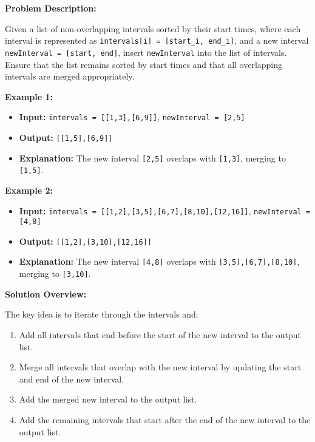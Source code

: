 

\textbf{Problem Description:}

Given a list of non-overlapping intervals sorted by their start times, where each interval is represented as \texttt{intervals[i] = [start\_i, end\_i]}, and a new interval \texttt{newInterval = [start, end]}, insert \texttt{newInterval} into the list of intervals. Ensure that the list remains sorted by start times and that all overlapping intervals are merged appropriately.

\textbf{Example 1:}

\begin{itemize}
    \item \textbf{Input:} \texttt{intervals = [[1,3],[6,9]]}, \texttt{newInterval = [2,5]}
    \item \textbf{Output:} \texttt{[[1,5],[6,9]]}
    \item \textbf{Explanation:} The new interval \texttt{[2,5]} overlaps with \texttt{[1,3]}, merging to \texttt{[1,5]}.
\end{itemize}

\textbf{Example 2:}

\begin{itemize}
    \item \textbf{Input:} \texttt{intervals = [[1,2],[3,5],[6,7],[8,10],[12,16]]}, \texttt{newInterval = [4,8]}
    \item \textbf{Output:} \texttt{[[1,2],[3,10],[12,16]]}
    \item \textbf{Explanation:} The new interval \texttt{[4,8]} overlaps with \texttt{[3,5],[6,7],[8,10]}, merging to \texttt{[3,10]}.
\end{itemize}

\textbf{Solution Overview:}

The key idea is to iterate through the intervals and:

\begin{enumerate}
    \item Add all intervals that end before the start of the new interval to the output list.
    \item Merge all intervals that overlap with the new interval by updating the start and end of the new interval.
    \item Add the merged new interval to the output list.
    \item Add the remaining intervals that start after the end of the new interval to the output list.
\end{enumerate}

